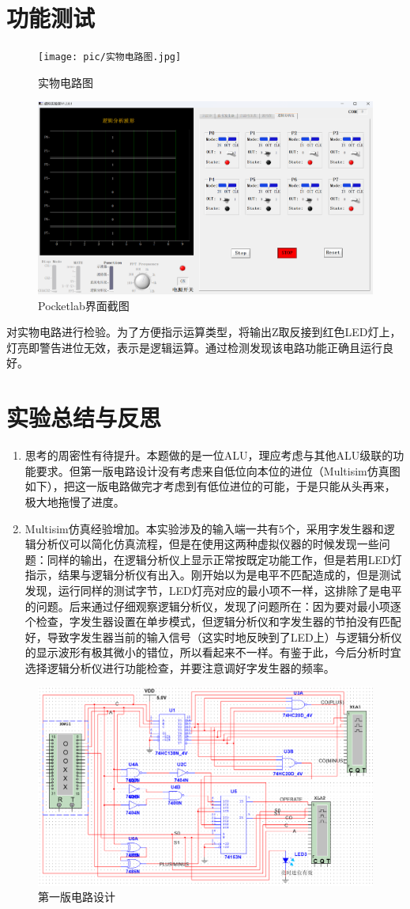 \documentclass{ctexart}
\begin{document}
\section{功能测试}
\begin{figure}[H]
    \centering
    \texttt{[image: pic/实物电路图.jpg]}
    \caption{实物电路图}
    \label{fig:enter-label}
\end{figure}
\begin{figure}[H]
    \centering
    \includegraphics[width=0.5\linewidth]{pic/pocketlab.png}
    \caption{Pocketlab界面截图}
    \label{fig:enter-label}
\end{figure}
对实物电路进行检验。为了方便指示运算类型，将输出Z取反接到红色LED灯上，灯亮即警告进位无效，表示是逻辑运算。通过检测发现该电路功能正确且运行良好。
\section{实验总结与反思}
\begin{enumerate}
    \item 思考的周密性有待提升。本题做的是一位ALU，理应考虑与其他ALU级联的功能要求。但第一版电路设计没有考虑来自低位向本位的进位（Multisim仿真图如下），把这一版电路做完才考虑到有低位进位的可能，于是只能从头再来，极大地拖慢了进度。
    \item Multisim仿真经验增加。本实验涉及的输入端一共有5个，采用字发生器和逻辑分析仪可以简化仿真流程，但是在使用这两种虚拟仪器的时候发现一些问题：同样的输出，在逻辑分析仪上显示正常按既定功能工作，但是若用LED灯指示，结果与逻辑分析仪有出入。刚开始以为是电平不匹配造成的，但是测试发现，运行同样的测试字节，LED灯亮对应的最小项不一样，这排除了是电平的问题。后来通过仔细观察逻辑分析仪，发现了问题所在：因为要对最小项逐个检查，字发生器设置在单步模式，但逻辑分析仪和字发生器的节拍没有匹配好，导致字发生器当前的输入信号（这实时地反映到了LED上）与逻辑分析仪的显示波形有极其微小的错位，所以看起来不一样。有鉴于此，今后分析时宜选择逻辑分析仪进行功能检查，并要注意调好字发生器的频率。
\end{enumerate}
\begin{figure}[H]
    \centering
    \includegraphics[width=0.5\linewidth]{pic/Multisim仿真图旧.png}
    \caption{第一版电路设计}
    \label{fig:enter-label}
\end{figure}
\end{document}
